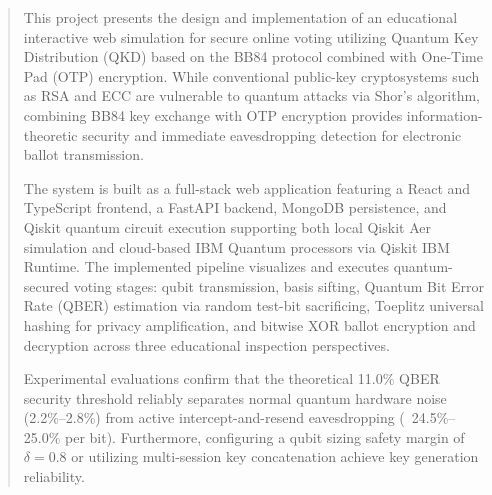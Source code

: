 \begin{abstract}
This project presents the design and implementation of an educational interactive web simulation for secure online voting utilizing Quantum Key Distribution (QKD) based on the BB84 protocol combined with One-Time Pad (OTP) encryption. While conventional public-key cryptosystems such as RSA and ECC are vulnerable to quantum attacks via Shor's algorithm, combining BB84 key exchange with OTP encryption provides information-theoretic security and immediate eavesdropping detection for electronic ballot transmission.

\enskip The system is built as a full-stack web application featuring a React and TypeScript frontend, a FastAPI backend, MongoDB persistence, and Qiskit quantum circuit execution supporting both local Qiskit Aer simulation and cloud-based IBM Quantum processors via Qiskit IBM Runtime. The implemented pipeline visualizes and executes quantum-secured voting stages: qubit transmission, basis sifting, Quantum Bit Error Rate (QBER) estimation via random test-bit sacrificing, Toeplitz universal hashing for privacy amplification, and bitwise XOR ballot encryption and decryption across three educational inspection perspectives.

\enskip Experimental evaluations confirm that the theoretical 11.0\% QBER security threshold reliably separates normal quantum hardware noise (2.2\%--2.8\%) from active intercept-and-resend eavesdropping (~24.5\%--25.0\% per bit). Furthermore, configuring a qubit sizing safety margin of $\delta = 0.8$ or utilizing multi-session key concatenation achieve key generation reliability.
\end{abstract}

%

